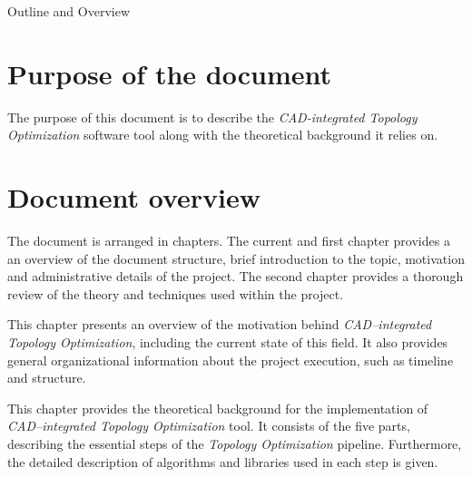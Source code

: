 \clearemptydoublepage

{}

\begin{center}
	\huge{Outline and Overview}
\end{center}




\section*{Purpose of the document}
The purpose of this document is to describe the \emph{CAD-integrated Topology Optimization} software tool along with the theoretical background it relies on.
%

\section*{Document overview}
The document is arranged in chapters. The current and first chapter provides a an overview of the document structure, brief introduction to the topic, motivation and administrative details of the project. The second chapter provides a thorough review of the theory and techniques used within the project.
  \vspace{1mm}

\noindent  This chapter presents an overview of the motivation behind \textit{CAD--integrated Topology Optimization}, including the current state of this field. It also provides general organizational information about the project execution, such as timeline and structure.
 \\


  \vspace{1mm}

\noindent This chapter provides the theoretical background for the implementation of \textit{CAD--integrated Topology Optimization} tool. It consists of the five parts, describing the essential steps of the \textit{Topology Optimization} pipeline. Furthermore, the detailed description of algorithms and libraries used in each step is given.
\\